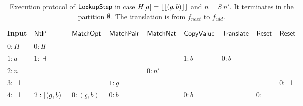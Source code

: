 \begin{table}[t]
  \centering
  \scriptsize
  \begin{tabular}{l||l|l|l|l|l|l|l|l}
    Input      & $\mathsf{Nth'}$      & $\mathsf{MatchOpt}$       & $\mathsf{MatchPair}$     & $\mathsf{MatchNat}$ & $\mathsf{CopyValue}$  & $\mathsf{Translate}$ & $\mathsf{Reset}$ & $\mathsf{Reset}$ \\ \hline
    $0:H$      & $0:H$            &                       &                      &                 &                   &                  &              &              \\
    $1:a$      & $1:\dashv$       &                       &                      &                 & $1:b$             & $0:b$            &              &              \\
    $2:n$      &                  &                       &                      & $0:n'$          &                   &                  &              &              \\
    $3:\dashv$ &                  &                       & $1: g$               &                 &                   &                  &              & $0:\dashv$   \\
    $4:\dashv$ & $2:\left\lfloor {(g,b)} \right\rfloor$ & $0:(g,b)$             & $0:b$                &                 & $0:b$             &                  & $0:\dashv$   &              \\
  \end{tabular}
  \caption{Execution protocol of $\mathsf{LookupStep}$ in case $H[a] = \left\lfloor {\left\lfloor {(g,b)} \right\rfloor} \right\rfloor$ and $n=S~n'$.  It terminates in the partition $\emptyset$.  The
    translation is from $f_{next}$ to $f_{add}$.}
  \label{tab:exec-LookupStep-S}
\end{table}
